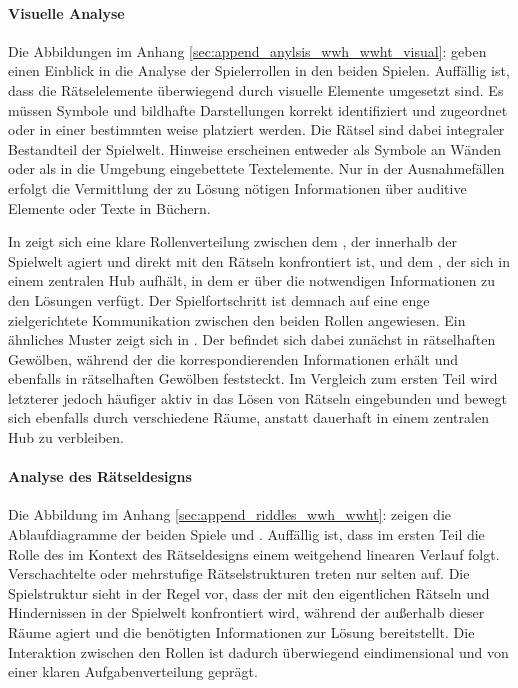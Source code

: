 \paragraph{Visuelle Analyse}
Die Abbildungen im Anhang \ref{sec:append_anylsis_wwh_wwht_visual}:  geben einen Einblick in die Analyse der Spielerrollen in den beiden Spielen. Auffällig ist, dass die Rätselelemente überwiegend durch visuelle Elemente umgesetzt sind. Es müssen Symbole und bildhafte Darstellungen korrekt identifiziert und zugeordnet oder in einer bestimmten weise platziert werden. Die Rätsel sind dabei integraler Bestandteil der Spielwelt. Hinweise erscheinen entweder als Symbole an Wänden oder als in die Umgebung eingebettete Textelemente. Nur in der Ausnahmefällen erfolgt die Vermittlung der zu Lösung nötigen Informationen über auditive Elemente oder Texte in Büchern.

In  zeigt sich eine klare Rollenverteilung zwischen dem , der innerhalb der Spielwelt agiert und direkt mit den Rätseln konfrontiert ist, und dem , der sich in einem zentralen Hub aufhält, in dem er über die notwendigen Informationen zu den Lösungen verfügt. Der Spielfortschritt ist demnach auf eine enge zielgerichtete Kommunikation zwischen den beiden Rollen angewiesen. Ein ähnliches Muster zeigt sich in  . Der  befindet sich dabei zunächst in rätselhaften Gewölben, während der  die korrespondierenden Informationen erhält und ebenfalls in rätselhaften Gewölben feststeckt. Im Vergleich zum ersten Teil wird letzterer jedoch häufiger aktiv in das Lösen von Rätseln eingebunden und bewegt sich ebenfalls durch verschiedene Räume, anstatt dauerhaft in einem zentralen Hub zu verbleiben.

\paragraph{Analyse des Rätseldesigns}
Die Abbildung im Anhang \ref{sec:append_riddles_wwh_wwht}:  zeigen die Ablaufdiagramme der beiden Spiele  und . Auffällig ist, dass im ersten Teil die Rolle des  im Kontext des Rätseldesigns einem weitgehend linearen Verlauf folgt. Verschachtelte oder mehrstufige Rätselstrukturen treten nur selten auf. Die Spielstruktur sieht in der Regel vor, dass der  mit den eigentlichen Rätseln und Hindernissen in der Spielwelt konfrontiert wird, während der  außerhalb dieser Räume agiert und die benötigten Informationen zur Lösung bereitstellt. Die Interaktion zwischen den Rollen ist dadurch überwiegend eindimensional und von einer klaren Aufgabenverteilung geprägt.

